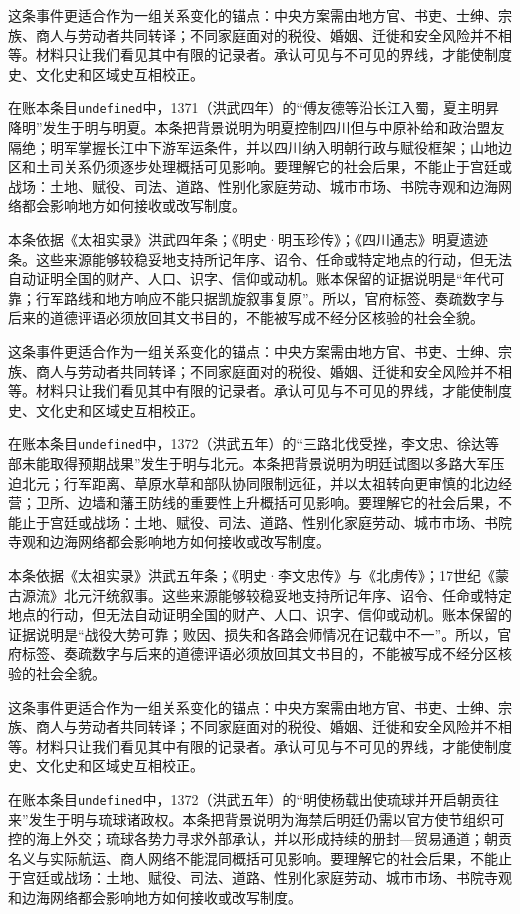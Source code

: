 这条事件更适合作为一组关系变化的锚点：中央方案需由地方官、书吏、士绅、宗族、商人与劳动者共同转译；不同家庭面对的税役、婚姻、迁徙和安全风险并不相等。材料只让我们看见其中有限的记录者。承认可见与不可见的界线，才能使制度史、文化史和区域史互相校正。

在账本条目\texttt{undefined}中，1371（洪武四年）的“傅友德等沿长江入蜀，夏主明昇降明”发生于明与明夏。本条把背景说明为明夏控制四川但与中原补给和政治盟友隔绝；明军掌握长江中下游军运条件，并以四川纳入明朝行政与赋役框架；山地边区和土司关系仍须逐步处理概括可见影响。要理解它的社会后果，不能止于宫廷或战场：土地、赋役、司法、道路、性别化家庭劳动、城市市场、书院寺观和边海网络都会影响地方如何接收或改写制度。

本条依据《太祖实录》洪武四年条；《明史·明玉珍传》；《四川通志》明夏遗迹条。这些来源能够较稳妥地支持所记年序、诏令、任命或特定地点的行动，但无法自动证明全国的财产、人口、识字、信仰或动机。账本保留的证据说明是“年代可靠；行军路线和地方响应不能只据凯旋叙事复原”。所以，官府标签、奏疏数字与后来的道德评语必须放回其文书目的，不能被写成不经分区核验的社会全貌。

这条事件更适合作为一组关系变化的锚点：中央方案需由地方官、书吏、士绅、宗族、商人与劳动者共同转译；不同家庭面对的税役、婚姻、迁徙和安全风险并不相等。材料只让我们看见其中有限的记录者。承认可见与不可见的界线，才能使制度史、文化史和区域史互相校正。

在账本条目\texttt{undefined}中，1372（洪武五年）的“三路北伐受挫，李文忠、徐达等部未能取得预期战果”发生于明与北元。本条把背景说明为明廷试图以多路大军压迫北元；行军距离、草原水草和部队协同限制远征，并以太祖转向更审慎的北边经营；卫所、边墙和藩王防线的重要性上升概括可见影响。要理解它的社会后果，不能止于宫廷或战场：土地、赋役、司法、道路、性别化家庭劳动、城市市场、书院寺观和边海网络都会影响地方如何接收或改写制度。

本条依据《太祖实录》洪武五年条；《明史·李文忠传》与《北虏传》；17世纪《蒙古源流》北元汗统叙事。这些来源能够较稳妥地支持所记年序、诏令、任命或特定地点的行动，但无法自动证明全国的财产、人口、识字、信仰或动机。账本保留的证据说明是“战役大势可靠；败因、损失和各路会师情况在记载中不一”。所以，官府标签、奏疏数字与后来的道德评语必须放回其文书目的，不能被写成不经分区核验的社会全貌。

这条事件更适合作为一组关系变化的锚点：中央方案需由地方官、书吏、士绅、宗族、商人与劳动者共同转译；不同家庭面对的税役、婚姻、迁徙和安全风险并不相等。材料只让我们看见其中有限的记录者。承认可见与不可见的界线，才能使制度史、文化史和区域史互相校正。

在账本条目\texttt{undefined}中，1372（洪武五年）的“明使杨载出使琉球并开启朝贡往来”发生于明与琉球诸政权。本条把背景说明为海禁后明廷仍需以官方使节组织可控的海上外交；琉球各势力寻求外部承认，并以形成持续的册封—贸易通道；朝贡名义与实际航运、商人网络不能混同概括可见影响。要理解它的社会后果，不能止于宫廷或战场：土地、赋役、司法、道路、性别化家庭劳动、城市市场、书院寺观和边海网络都会影响地方如何接收或改写制度。

